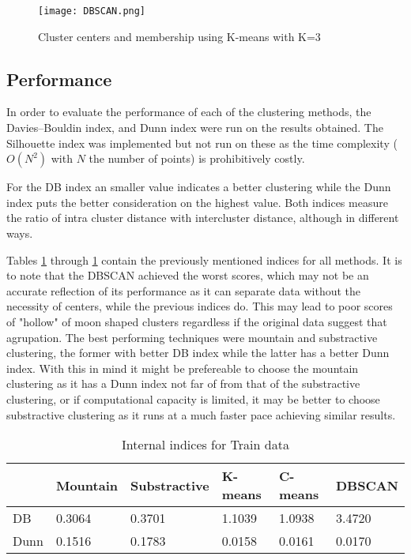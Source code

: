 \begin{figure}[t]
    \texttt{[image: DBSCAN.png]}
    \caption{Cluster centers and membership using K-means with K=3
    \label{fig:dbscan}}
\end{figure}

\subsection{Performance}
In order to evaluate the performance of each of the clustering methods, the 
Davies–Bouldin index, and Dunn index were run on the results obtained. The
Silhouette index was implemented but not run on these as the time complexity
($O(N^2)$ with $N$ the number of points) is prohibitively costly. 

For the DB index an smaller value indicates a better clustering while the Dunn
index puts the better consideration on the highest value. Both indices measure
the ratio of intra cluster distance with intercluster distance, although in 
different ways.

Tables \ref{tab:external:train} through \ref{tab:external:train} contain the
previously mentioned indices for all methods. It is to note that the DBSCAN 
achieved the worst scores, which may not be an accurate reflection of its
performance as it can separate data without the necessity of centers, while the
previous indices do. This may lead to poor scores of "hollow" of moon shaped
clusters regardless if the original data suggest that agrupation. The best 
performing techniques were mountain and substractive clustering, the former with
better DB index while the latter has a better Dunn index. With this in mind
it might be prefereable to choose the mountain clustering as it has a Dunn index
not far of from that of the substractive clustering, or if computational capacity
is limited, it may be better to choose substractive clustering as it runs
at a much faster pace achieving similar results.

\begin{table}
    \begin{tabular}{l|lllll}
             & Mountain & Substractive & K-means & C-means & DBSCAN\\\hline
        DB   & 0.3064 & 0.3701 & 1.1039 & 1.0938 & 3.4720\\
        Dunn & 0.1516 & 0.1783 & 0.0158 & 0.0161 & 0.0170
    \end{tabular}
    \caption{Internal indices for Train data\label{tab:external:train}}
\end{table}


